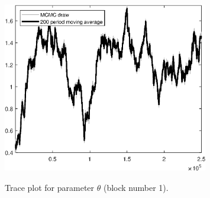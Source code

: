 \begin{figure}[H]
\centering
  \includegraphics[width=0.8\textwidth]{BRS_aggregate/graphs/TracePlot_theta_blck_1}\\
    \caption{Trace plot for parameter ${\theta}$ (block number 1).}
\end{figure}
